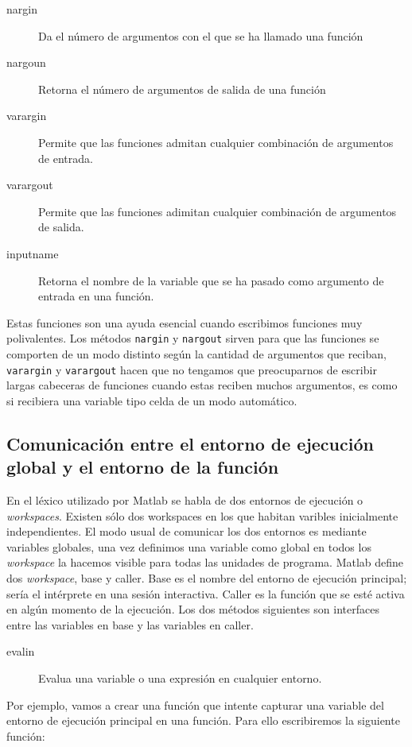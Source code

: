 \begin{description}
\item [nargin]Da el número de argumentos con el que se
  ha llamado una función
\item [nargoun]Retorna el número de argumentos de
  salida de una función
\item [varargin]Permite que las funciones admitan
  cualquier combinación de argumentos de entrada.
\item [varargout]Permite que las funciones adimitan
  cualquier combinación de argumentos de salida.
\item [inputname]Retorna el nombre de la variable que
  se ha pasado como argumento de entrada en una función.
\end{description}
Estas funciones son una ayuda esencial cuando escribimos funciones muy
polivalentes. Los métodos \texttt{nargin} y \texttt{nargout} sirven
para que las funciones se comporten de un modo distinto según la
cantidad de argumentos que reciban, \texttt{varargin} y
\texttt{varargout} hacen que no tengamos que preocuparnos de escribir
largas cabeceras de funciones cuando estas reciben muchos argumentos,
es como si recibiera una variable tipo celda de un modo automático.


\subsection{Comunicación entre el entorno de ejecución global y el
  entorno de la función}

En el léxico utilizado por Matlab se habla de dos entornos de
ejecución o \emph{workspaces}. Existen sólo dos workspaces en los que
habitan varibles inicialmente independientes. El modo usual de
comunicar los dos entornos es mediante variables globales, una vez
definimos una variable como global en todos los \emph{workspace} la
hacemos visible para todas las unidades de programa. Matlab define dos
\emph{workspace}, base y caller. Base es el nombre del entorno de
ejecución principal; sería el intérprete en una sesión interactiva.
Caller es la función que se esté activa en algún momento de la
ejecución. Los dos métodos siguientes son interfaces entre las
variables en base y las variables en caller.

\begin{description}
\item [evalin]Evalua una variable o una expresión en
  cualquier entorno.
\end{description}
Por ejemplo, vamos a crear una función que intente capturar una
variable del entorno de ejecución principal en una función. Para ello
escribiremos la siguiente función:

